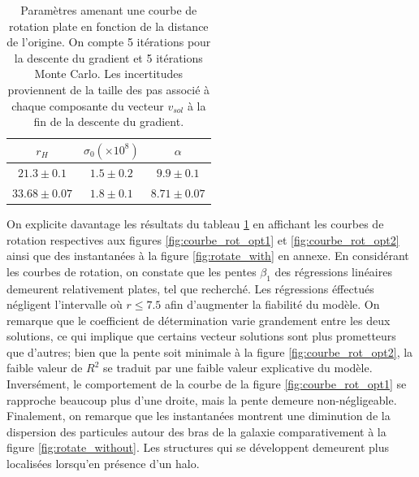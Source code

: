 \documentclass{article}
\begin{document}
\begin{table}[H]
	\begin{center}
		\caption{Paramètres amenant une courbe de rotation plate en fonction de la distance de l'origine. On compte 5 itérations pour la descente du gradient et 5 itérations Monte Carlo. Les incertitudes proviennent de la taille des pas associé à chaque composante du vecteur $v_{sol}$ à la fin de la descente du gradient.}
		\label{tab:param}
		\begin{tabular}{|c|c|c|} %
			\hline
			\textbf{$r_H$} & \textbf{$\sigma_0  (\times 10^8)$} & \textbf{$\alpha$} \\\hline
			$21.3 \pm 0.1$ & $1.5 \pm 0.2$ & $9.9 \pm 0.1$\\
			$33.68 \pm 0.07$ & $1.8 \pm 0.1$ & $8.71 \pm 0.07$\\\hline
		\end{tabular}
	\end{center}
\end{table}

On explicite davantage les résultats du tableau \ref{tab:param} en affichant les courbes de rotation respectives aux figures \ref{fig:courbe_rot_opt1} et \ref{fig:courbe_rot_opt2} ainsi que des instantanées à la figure \ref{fig:rotate_with} en annexe. En considérant les courbes de rotation, on constate que les pentes $\beta_1$ des régressions linéaires demeurent relativement plates, tel que recherché. Les régressions éffectués négligent l'intervalle où $r \leq 7.5$ afin d'augmenter la fiabilité du modèle.  On remarque que le coefficient de détermination varie grandement entre les deux solutions, ce qui implique que certains vecteur solutions sont plus prometteurs que d'autres; bien que la pente soit minimale à la figure \ref{fig:courbe_rot_opt2}, la faible valeur de $R^2$ se traduit par une faible valeur explicative du modèle. Inversément, le comportement de la courbe de la figure \ref{fig:courbe_rot_opt1} se rapproche beaucoup plus d'une droite, mais la pente demeure non-négligeable. Finalement, on remarque que les instantanées montrent une diminution de la dispersion des particules autour des bras de la galaxie comparativement à la figure \ref{fig:rotate_without}. Les structures qui se développent demeurent plus localisées lorsqu'en présence d'un halo.


\end{document}
